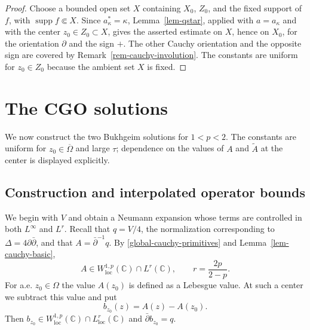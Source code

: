 \documentclass[a4paper,11pt]{article}
\newcommand{\C}{\mathbb{C}}
\theoremstyle{plain}
\theoremstyle{definition}
\theoremstyle{remark}
\begin{document}
\begin{proof}
Choose a bounded open set $X$ containing $X_0$, $Z_0$, and the fixed support of
$f$, with $\operatorname{supp}f\Subset X$.  Since $a_\kappa^*=\kappa$, Lemma~\ref{lem-qstar}, applied with $a=a_\kappa$ and with the
center $z_0\in Z_0\subset X$, gives the asserted estimate on $X$, hence on
$X_0$, for the orientation $\partial$ and the sign $+$.  The other Cauchy
orientation and the opposite sign are covered by Remark~\ref{rem-cauchy-involution}.  The constants are uniform for $z_0\in Z_0$ because the
ambient set $X$ is fixed.
\end{proof}


\section{The CGO solutions}\label{sec:cgo-construction}

We now construct the two Bukhgeim solutions for $1<p<2$. The constants are uniform for $z_0\in\overline\Omega$ and large $\tau$; dependence on the values of $A$ and $\widetilde A$ at the center is displayed explicitly.

\subsection{Construction and interpolated operator bounds}

We begin with $V$ and obtain a Neumann expansion whose terms are controlled in both $L^\infty$ and $L^r$.  Recall that $q=V/4$, the normalization corresponding to $\Delta=4\partial\bar\partial$, and that $A=\bar\partial^{-1}q$.  By \eqref{global-cauchy-primitives} and Lemma~\ref{lem-cauchy-basic},
\begin{equation}
        A\in W^{1,p}_{\mathrm{loc}}(\C)\cap L^{r}(\C),
        \qquad r=\frac{2p}{2-p}.
\end{equation}
For a.e. $z_0\in\Omega$ the value $A(z_0)$ is defined as a Lebesgue value.  At such a center we subtract this value and put
\begin{equation}
        b_{z_0}(z)=A(z)-A(z_0).
\end{equation}
Then $b_{z_0}\in W^{1,p}_{\mathrm{loc}}(\C)\cap L^{r}_{\mathrm{loc}}(\C)$ and $\bar\partial b_{z_0}=q$.
\end{document}
